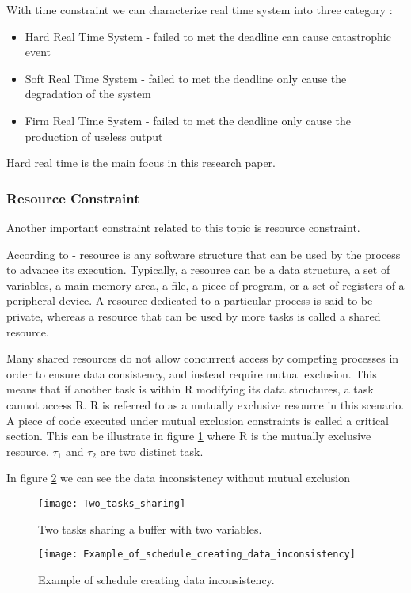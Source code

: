 With time constraint we can characterize real time system into three category :
\begin{itemize}
\item Hard Real Time System - failed to met the deadline can cause catastrophic event 
\item Soft Real Time System - failed to met the deadline only cause the degradation of the system 
\item Firm Real Time System - failed to met the deadline only cause the production of useless output 
\end{itemize}

Hard real time is the main focus in this research paper.
\subsubsection{Resource Constraint}

Another important constraint related to this topic is resource constraint. 

According to \cite{b5} - resource is any software structure that can be used by the process to advance its execution. Typically, a resource can be a data structure, a set of variables, a main memory area, a file, a piece of program, or a set of registers of a peripheral device. A resource dedicated to a particular process is said to be private, whereas a resource that can be used by more tasks is called a shared resource.

Many shared resources do not allow concurrent access by competing processes in order to ensure data consistency, and instead require mutual exclusion. This means that if another task is within R modifying its data structures, a task cannot access R. R is referred to as a mutually exclusive resource in this scenario.  A piece of code executed under mutual exclusion constraints is called a critical section. This can be illustrate in figure \ref{fig:Two_tasks_sharing} where R is the mutually exclusive resource, $ \tau_{1} $ and $\tau_{2} $ are two distinct task.

In figure \ref{fig:Example_of_schedule_creating_data_inconsistency} we can see the data inconsistency without mutual exclusion
\begin{figure}[h]
    \centering
    \texttt{[image: Two\_tasks\_sharing]}
    \caption{ Two tasks sharing a buffer with two variables. \cite{b5}}
    \label{fig:Two_tasks_sharing}
\end{figure}

\begin{figure}[h]
    \centering
    \texttt{[image: Example\_of\_schedule\_creating\_data\_inconsistency]}
    \caption{Example of schedule creating data inconsistency. \cite{b5}}
    \label{fig:Example_of_schedule_creating_data_inconsistency}
\end{figure}

